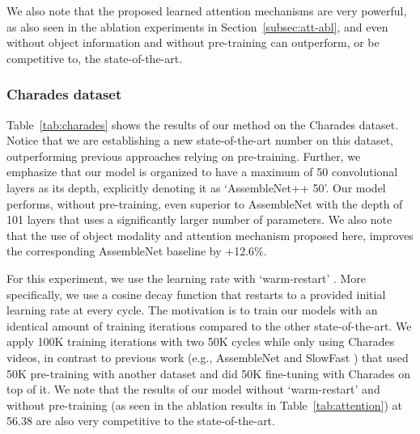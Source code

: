 \documentclass[runningheads]{llncs}
\begin{document}
We also note that the proposed learned attention mechanisms are very powerful, as also seen in the ablation experiments in Section~\ref{subsec:att-abl}, and even without object information and without pre-training can outperform, or be competitive to, the state-of-the-art.



\subsubsection{Charades dataset}

Table~\ref{tab:charades} shows the results of our method on the Charades dataset. 
Notice that we are establishing a new state-of-the-art number on this dataset, outperforming previous approaches relying on pre-training. Further, we emphasize that our model is organized to have a maximum of 50 convolutional layers as its depth, explicitly denoting it as `AssembleNet++ 50'. Our model performs, without pre-training, even superior to AssembleNet with the depth of 101 layers that uses a significantly larger number of parameters. We also note that the use of object modality and attention mechanism proposed here, improves the corresponding AssembleNet baseline by +12.6\%. 

For this experiment, we use the learning rate with `warm-restart' \cite{loshchilov2017}. More specifically, we use a cosine decay function that restarts to a provided initial learning rate at every cycle. The motivation is to train our models with an identical amount of training iterations compared to the other state-of-the-art. We apply 100K training iterations with two 50K cycles while only using Charades videos, in contrast to previous work (e.g., AssembleNet \cite{ryoo2019assemblenet} and SlowFast \cite{feichtenhofer2018slowfast}) that used 50K pre-training with another dataset and did 50K fine-tuning with Charades on top of it. We note that the results of our model without `warm-restart' and without pre-training (as seen in the ablation results in Table~\ref{tab:attention}) at 56.38 are also very competitive to the state-of-the-art. 
\end{document}
